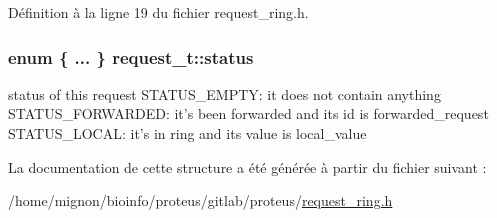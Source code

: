 Définition à la ligne 19 du fichier request\+\_\+ring.\+h.

\hypertarget{structrequest__t_a091a4bcea10a60e492f6d5e0701971b1}{
\subsubsection[{status}]{\setlength{\rightskip}{0pt plus 5cm}enum \{ ... \}   request\+\_\+t\+::status}}\label{structrequest__t_a091a4bcea10a60e492f6d5e0701971b1}
status of this request S\+T\+A\+T\+U\+S\+\_\+\+E\+M\+P\+T\+Y\+: it does not contain anything S\+T\+A\+T\+U\+S\+\_\+\+F\+O\+R\+W\+A\+R\+D\+E\+D\+: it's been forwarded and its id is forwarded\+\_\+request S\+T\+A\+T\+U\+S\+\_\+\+L\+O\+C\+A\+L\+: it's in ring and its value is local\+\_\+value 

La documentation de cette structure a été générée à partir du fichier suivant \+:\begin{DoxyCompactItemize}
\item 
/home/mignon/bioinfo/proteus/gitlab/proteus/\hyperlink{request__ring_8h}{request\+\_\+ring.\+h}\end{DoxyCompactItemize}
